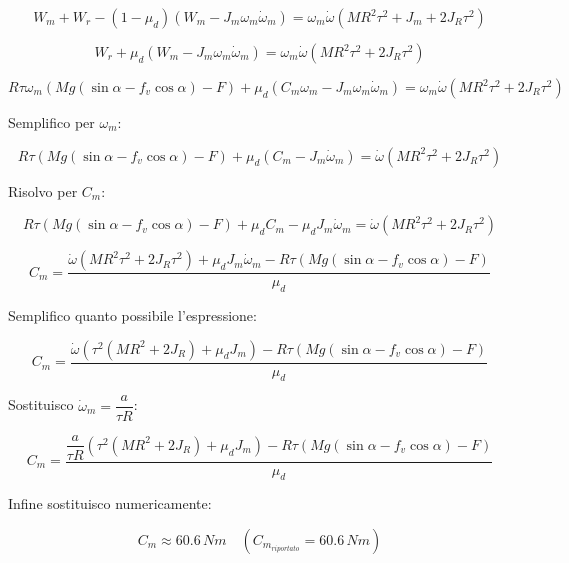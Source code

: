 \documentclass[main.tex]{subfiles}
\begin{document}
\[
	W_m + W_r - (1-\mu_d)(W_m - J_m\omega_m\dot{\omega}_m) = \omega_m\dot{\omega}(MR^2\tau^2 + J_m + 2J_R\tau^2)
\]

\[
	W_r +\mu_d(W_m - J_m\omega_m\dot{\omega}_m) = \omega_m\dot{\omega}(MR^2\tau^2 + 2J_R\tau^2)
\]

\[
	R\tau\omega_m(Mg(\sin\alpha - f_v\cos\alpha) - F) +\mu_d(C_m\omega_m - J_m\omega_m\dot{\omega}_m) = \omega_m\dot{\omega}(MR^2\tau^2 + 2J_R\tau^2)
\]

Semplifico per $\omega_m$:

\[
	R\tau(Mg(\sin\alpha - f_v\cos\alpha) - F) +\mu_d(C_m - J_m\dot{\omega}_m) = \dot{\omega}(MR^2\tau^2 + 2J_R\tau^2)
\]

Risolvo per $C_m$:

\[
	R\tau(Mg(\sin\alpha - f_v\cos\alpha) - F) +\mu_dC_m - \mu_dJ_m\dot{\omega}_m = \dot{\omega}(MR^2\tau^2 + 2J_R\tau^2)
\]

\[
	C_m = \frac{\dot{\omega}(MR^2\tau^2 + 2J_R\tau^2) + \mu_dJ_m\dot{\omega}_m - R\tau(Mg(\sin\alpha - f_v\cos\alpha) - F)}{\mu_d}
\]

Semplifico quanto possibile l'espressione:

\[
	C_m = \frac{\dot{\omega}(\tau^2 (MR^2 + 2J_R) + \mu_dJ_m) - R\tau(Mg(\sin\alpha - f_v\cos\alpha) - F)}{\mu_d}
\]

Sostituisco $\dot{\omega}_m =\dfrac{a}{\tau R}$:

\[
	C_m = \frac{\dfrac{a}{\tau R}(\tau^2 (MR^2 + 2J_R) + \mu_dJ_m) - R\tau(Mg(\sin\alpha - f_v\cos\alpha) - F)}{\mu_d}
\]

Infine sostituisco numericamente:

\[
	C_m \approx 60.6\,Nm \quad (C_{m_{riportato}} = 60.6\,Nm)
\]
\end{document}
